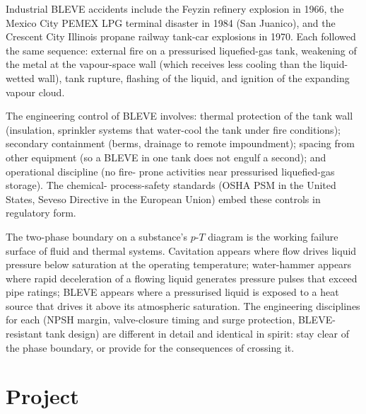 Industrial BLEVE accidents include the Feyzin refinery explosion in
1966, the Mexico City PEMEX LPG terminal disaster in 1984 (San
Juanico), and the Crescent City Illinois propane railway tank-car
explosions in 1970. Each followed the same sequence: external fire on
a pressurised liquefied-gas tank, weakening of the metal at the
vapour-space wall (which receives less cooling than the liquid-wetted
wall), tank rupture, flashing of the liquid, and ignition of the
expanding vapour cloud.

The engineering control of BLEVE involves: thermal protection of the
tank wall (insulation, sprinkler systems that water-cool the tank
under fire conditions); secondary containment (berms, drainage to
remote impoundment); spacing from other equipment (so a BLEVE in one
tank does not engulf a second); and operational discipline (no fire-
prone activities near pressurised liquefied-gas storage). The chemical-
process-safety standards (OSHA PSM in the United States, Seveso
Directive in the European Union) embed these controls in regulatory
form.

\begin{principle}
The two-phase boundary on a substance's $p$-$T$ diagram is the working
failure surface of fluid and thermal systems. Cavitation appears
where flow drives liquid pressure below saturation at the operating
temperature; water-hammer appears where rapid deceleration of a
flowing liquid generates pressure pulses that exceed pipe ratings;
BLEVE appears where a pressurised liquid is exposed to a heat source
that drives it above its atmospheric saturation. The engineering
disciplines for each (NPSH margin, valve-closure timing and surge
protection, BLEVE-resistant tank design) are different in detail and
identical in spirit: stay clear of the phase boundary, or provide for
the consequences of crossing it.
\end{principle}

\section{Project}

